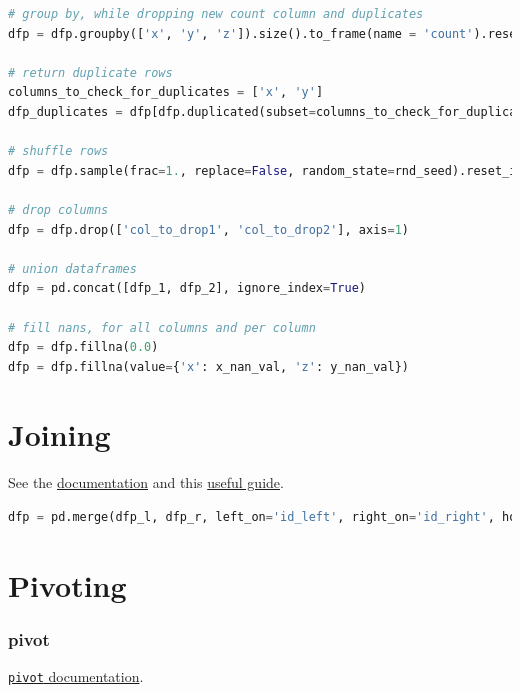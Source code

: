 \begin{lstlisting}[language=Python]
# group by, while dropping new count column and duplicates
dfp = dfp.groupby(['x', 'y', 'z']).size().to_frame(name = 'count').reset_index().drop(['count'], axis=1).drop_duplicates()

# return duplicate rows
columns_to_check_for_duplicates = ['x', 'y']
dfp_duplicates = dfp[dfp.duplicated(subset=columns_to_check_for_duplicates, keep=False)]

# shuffle rows
dfp = dfp.sample(frac=1., replace=False, random_state=rnd_seed).reset_index(drop=True)

# drop columns
dfp = dfp.drop(['col_to_drop1', 'col_to_drop2'], axis=1)

# union dataframes
dfp = pd.concat([dfp_1, dfp_2], ignore_index=True)

# fill nans, for all columns and per column
dfp = dfp.fillna(0.0)
dfp = dfp.fillna(value={'x': x_nan_val, 'z': y_nan_val})
\end{lstlisting}

\clearpage

\section{Joining}
\label{pandas:join}

\noindent See the \href{https://pandas.pydata.org/pandas-docs/stable/user_guide/merging.html#database-style-dataframe-or-named-series-joining-merging}{documentation}
and this
\href{https://chrisalbon.com/code/python/data_wrangling/pandas_join_merge_dataframe/}{useful guide}.

\begin{lstlisting}[language=Python]
dfp = pd.merge(dfp_l, dfp_r, left_on='id_left', right_on='id_right', how='left')
\end{lstlisting}

\section{Pivoting}
\label{pandas:pivoting}

\subsubsection{pivot}
\label{pandas:pivoting:pivot}

\noindent \href{http://pandas.pydata.org/pandas-docs/stable/reference/api/pandas.DataFrame.pivot.html}{\texttt{pivot} documentation}.

